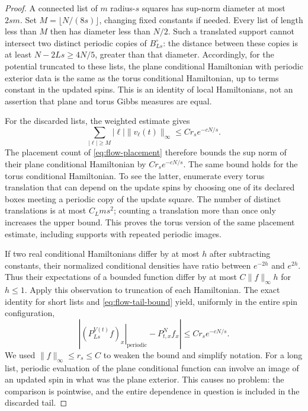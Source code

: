 \begin{proof}
A connected list of \(m\) radius-\(s\) squares has sup-norm diameter at
most \(2sm\).  Set \(M=\lfloor N/(8s)\rfloor\), changing fixed
constants if needed.  Every list of length less than \(M\) then has
diameter less than \(N/2\).  Such a translated support cannot intersect
two distinct periodic copies of \(B_{Ls}^\circ\): the distance between
these copies is at least \(N-2Ls\ge4N/5\), greater than that diameter.
Accordingly, for the potential truncated to these lists, the plane
conditional Hamiltonian with periodic exterior data is the same as the
torus conditional Hamiltonian, up to terms constant in the updated spins.
This is an identity of local Hamiltonians, not an assertion that plane and
torus Gibbs measures are equal.

For the discarded lists, the weighted estimate gives
\begin{equation}\label{eq:flow-tail-bound}
 \sum_{|\ell|\ge M}|\ell|\|v_\ell(t)\|_\infty
 \le C r_s e^{-cN/s}.
\end{equation}
The placement count of \eqref{eq:flow-placement} therefore bounds the
sup norm of their plane conditional Hamiltonian by
\(Cr_s e^{-cN/s}\).  The same bound holds for the torus conditional
Hamiltonian.  To see the latter, enumerate every torus translation that
can depend on the update spins by choosing one of its declared boxes
meeting a periodic copy of the update square.  The number of distinct
translations is at most \(C_Lms^2\); counting a translation more than
once only increases the upper bound.  This proves the torus version of
the same placement estimate, including supports with repeated periodic
images.

If two real conditional Hamiltonians differ by at most \(h\) after
subtracting constants, their normalized conditional densities have ratio
between \(e^{-2h}\) and \(e^{2h}\).  Thus their expectations of a bounded
function differ by at most \(C\|f\|_\infty h\) for \(h\le1\).
Apply this observation to truncation of each Hamiltonian.  The exact
identity for short lists and \eqref{eq:flow-tail-bound} yield, uniformly
in the entire spin configuration,
\begin{equation}\label{eq:flow-conditional-periodic-difference}
 \left|\left.(P_{Ls}^{V(t)}f)_x\right|_{\mathrm{periodic}}
             -P_{t,x}^{N}f_x\right|
 \le C r_s e^{-cN/s}.
\end{equation}
We used \(\|f\|_\infty\le r_s\le C\) to weaken the bound and simplify
notation.  For a long list, periodic evaluation of the plane conditional
function can involve an image of an updated spin in what was the plane
exterior.  This causes no problem: the comparison is pointwise, and the
entire dependence in question is included in the discarded tail.


\end{proof}
